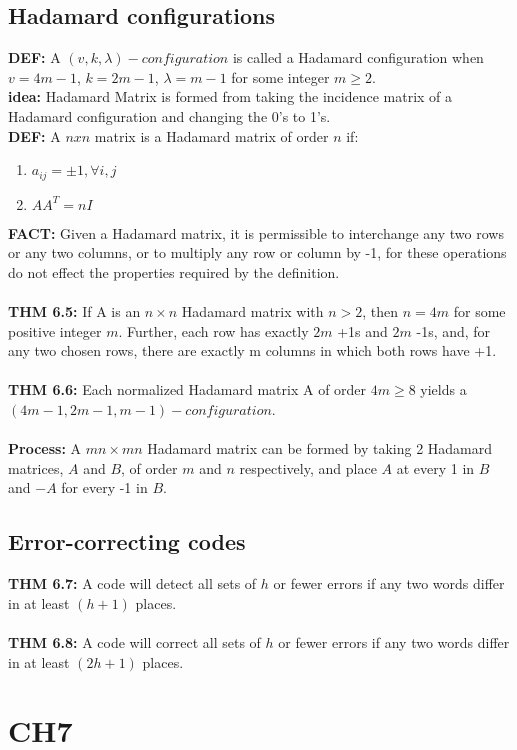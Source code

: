 \documentclass[12pt]{article}
\begin{document}
	\subsection{Hadamard configurations}
	\textbf{DEF: } A $ (v,k,\lambda)-configuration $ is called a Hadamard configuration  when $ v =
	4m-1 $, $ k = 2m -1 $, $ \lambda =	m - 	1 $ for some integer $ m\geq2 $. \\
	\textbf{idea: } Hadamard Matrix is formed from taking the incidence matrix of a Hadamard configuration and changing the 0's to 1's.\\
	\textbf{DEF: } A  $ nxn $ matrix is a Hadamard matrix of order $ n $ if:
	\begin{enumerate}
		\item$  a_{ij} = \pm1, \forall i,j$
		\item $ AA^T = nI $
	\end{enumerate}
	\textbf{FACT: } Given a Hadamard matrix, it is permissible to interchange any two	rows or any two columns, or to multiply any row or column by -1, for	these operations do not effect the properties required by the definition.\\\\
	\textbf{THM 6.5: } If A is an $ n\times n $ Hadamard matrix with $ n>2 $, then
	$ n= 4m $ for some positive integer $ m $. Further, each row has exactly $ 2m $ +1s
	and $ 2m $ -1s, and, for any two chosen rows, there are exactly m columns in which both rows have +1.\\\\
	\textbf{THM 6.6: } Each normalized Hadamard matrix A of order $ 4m \geq 8 $
	yields a $ (4m -1, 2m -	1,m -	1)-configuration $. \\\\
	\textbf{Process: } A $ mn\times mn $ Hadamard matrix can be formed by taking 2 Hadamard matrices, $ A $ and $ B $, of order $ m $ and $ n $ respectively, and place $ A $ at every 1 in $ B $ and $ -A $ for every -1 in $ B $.
	\subsection{Error-correcting codes}
	\textbf{THM 6.7: } A code will detect all sets of $ h $ or fewer errors if any	two words differ in at least $ (h + 1) $ places.\\\\
	\textbf{THM 6.8: } A code will correct all sets of $ h $ or fewer errors if any two words differ in at least $ (2h + 1) $ places.
	\section{CH7}
\end{document}
